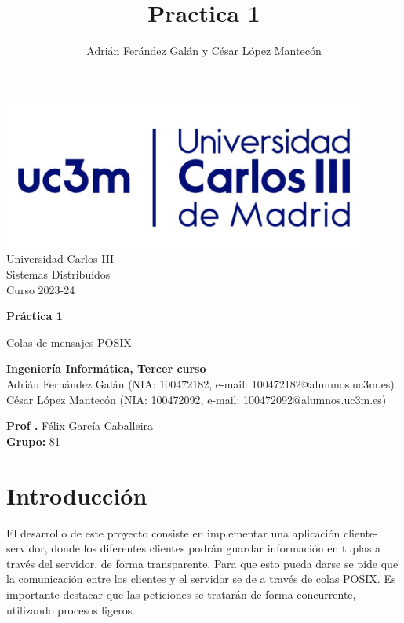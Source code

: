 \documentclass[]{article}
\title{Practica 1}
\author{Adrián Ferández Galán y César López Mantecón}
\begin{document}
\begin{titlepage}
    \centering
   \includegraphics[width=0.9\textwidth]{uc3m.jpg} 
    {\Huge Universidad Carlos III\\
    
     \Large Sistemas Distribuídos\\
     \vspace{0.5cm}
     Curso 2023-24}
    \vspace{2cm}

    {\Huge \textbf{Práctica 1} \par}
    \vspace{0.5cm}
    {\Large Colas de mensajes POSIX \par}
    \vspace{8cm}

   \textbf{Ingeniería Informática, Tercer curso}\\
    \vspace{0.2cm} 
    Adrián Fernández Galán (NIA: 100472182, e-mail: 100472182@alumnos.uc3m.es) \\
    César López Mantecón   (NIA: 100472092, e-mail: 100472092@alumnos.uc3m.es)
    \vspace{0.5cm}

   
    \textbf{Prof .} Félix García Caballeira\\
    \textbf{Grupo: } 81   
    
\end{titlepage}
\newpage

\renewcommand{\contentsname}{\centering Índice}
\tableofcontents

\newpage

\section{Introducción}
\label{sec:introduccion}
El desarrollo de este proyecto consiste en implementar una aplicación cliente-servidor, donde los diferentes clientes podrán guardar información en tuplas a través del servidor, de forma transparente.
Para que esto pueda darse se pide que la comunicación entre los clientes y el servidor se de a través de colas POSIX.
Es importante destacar que las peticiones se tratarán de forma concurrente, utilizando procesos ligeros.
\end{document}
